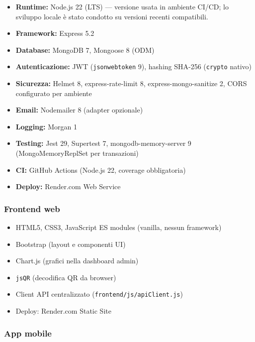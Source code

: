 \documentclass[11pt,a4paper]{article}
\newcommand{\code}[1]{\texttt{#1}}
\begin{document}
\begin{itemize}[noitemsep]
  \item \textbf{Runtime:} Node.js 22 (LTS) --- versione usata in ambiente CI/CD; lo sviluppo locale è stato condotto su versioni recenti compatibili.
  \item \textbf{Framework:} Express 5.2
  \item \textbf{Database:} MongoDB 7, Mongoose 8 (ODM)
  \item \textbf{Autenticazione:} JWT (\code{jsonwebtoken} 9), hashing SHA-256 (\code{crypto} nativo)
  \item \textbf{Sicurezza:} Helmet 8, express-rate-limit 8, express-mongo-sanitize 2, CORS configurato per ambiente
  \item \textbf{Email:} Nodemailer 8 (adapter opzionale)
  \item \textbf{Logging:} Morgan 1
  \item \textbf{Testing:} Jest 29, Supertest 7, mongodb-memory-server 9 (MongoMemoryReplSet per transazioni)
  \item \textbf{CI:} GitHub Actions (Node.js 22, coverage obbligatoria)
  \item \textbf{Deploy:} Render.com Web Service
\end{itemize}

\subsubsection*{Frontend web}

\begin{itemize}[noitemsep]
  \item HTML5, CSS3, JavaScript ES modules (vanilla, nessun framework)
  \item Bootstrap (layout e componenti UI)
  \item Chart.js (grafici nella dashboard admin)
  \item \code{jsQR} (decodifica QR da browser)
  \item Client API centralizzato (\code{frontend/js/apiClient.js})
  \item Deploy: Render.com Static Site
\end{itemize}

\subsubsection*{App mobile}
\end{document}
